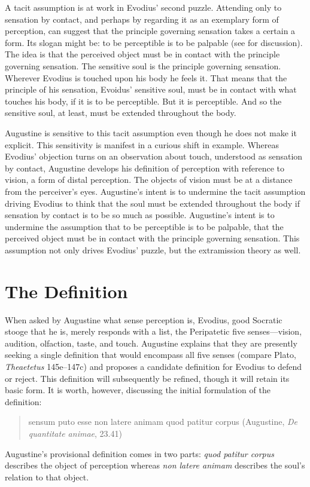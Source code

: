 \documentclass[12pt]{article}
\begin{document}
A tacit assumption is at work in Evodius' second puzzle. Attending only to sensation by contact, and perhaps by regarding it as an exemplary form of perception, can suggest that the principle governing sensation takes a certain a form. Its slogan might be: to be perceptible is to be palpable (see \citealt{Kalderon:2015fr} for discussion). The idea is that the perceived object must be in contact with the principle governing sensation. The sensitive soul is the principle governing sensation. Wherever Evodius is touched upon his body he feels it. That means that the principle of his sensation, Evoidus' sensitive soul, must be in contact with what touches his body, if it is to be perceptible. But it is perceptible. And so the sensitive soul, at least, must be extended throughout the body.

Augustine is sensitive to this tacit assumption even though he does not make it explicit. This sensitivity is manifest in a curious shift in example. Whereas Evodius' objection turns on an observation about touch, understood as sensation by contact, Augustine develops his definition of perception with reference to vision, a form of distal perception. The objects of vision must be at a distance from the perceiver's eyes. Augustine's intent is to undermine the tacit assumption driving Evodius to think that the soul must be extended throughout the body if sensation by contact is to be so much as possible. Augustine's intent is to undermine the assumption that to be perceptible is to be palpable, that the perceived object must be in contact with the principle governing sensation. This assumption not only drives Evodius' puzzle, but the extramission theory as well. 


\section{The Definition} %
\label{sec:the_definition}

When asked by Augustine what sense perception is, Evodius, good Socratic stooge that he is, merely responds with a list, the Peripatetic five senses---vision, audition, olfaction, taste, and touch. Augustine explains that they are presently seeking a single definition that would encompass all five senses (compare Plato, \emph{Theaetetus} 145e--147c) and proposes a candidate definition for Evodius to defend or reject. This definition will subsequently be refined, though it will retain its basic form. It is worth, however, discussing the initial formulation of the definition: 
\begin{quote}
	sensum puto esse non latere animam quod patitur corpus (Augustine, \emph{De quantitate animae}, 23.41)
\end{quote}
Augustine's provisional definition comes in two parts: \emph{quod patitur corpus} describes the object of perception whereas \emph{non latere animam} describes the soul's relation to that object. 
\end{document}
